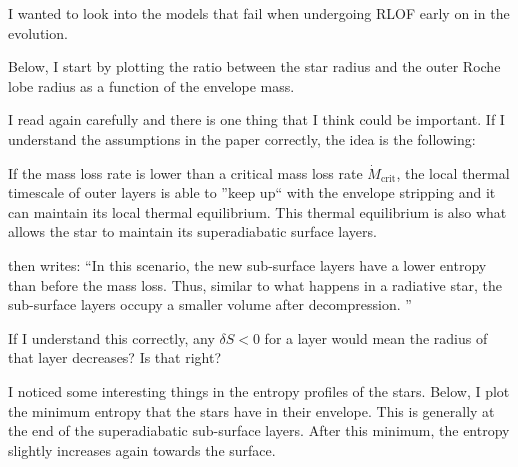 \documentclass[a4paper,10pt]{article}
\begin{document}
I wanted to look into the models that fail when undergoing RLOF early on in the evolution.

Below, I start by plotting the ratio between the star radius and the outer Roche lobe radius as
a function of the envelope mass.

\begin{figure}[ht]
	\centering
\end{figure}

I read \citet{temmink2022} again carefully and there is one thing that I think could be important.
If I understand the assumptions in the paper correctly, the idea is the following:

If the mass loss rate is lower than a critical mass loss rate \(\dot{M}_\text{crit}\), the local
thermal timescale of outer layers is able to ''keep up`` with the envelope stripping and it
can maintain its local thermal equilibrium.
This thermal equilibrium is also what allows the star
to maintain its superadiabatic surface layers.

\citet{temmink2022} then writes: ``In this scenario, the new sub-surface layers have a lower entropy than before the mass loss.
Thus, similar to what happens in a radiative star, the sub-surface layers occupy a smaller volume after decompression.
''

If I understand this correctly, any \(\delta S < 0\) for a layer would mean the radius of that layer decreases?
Is that right?

I noticed some interesting things in the entropy profiles of the stars.
Below, I plot the minimum entropy that the stars have in their envelope.
This is generally
at the end of the superadiabatic sub-surface layers.
After this minimum, the entropy slightly
increases again towards the surface.

\begin{figure}[ht]
	\centering
\end{figure}
\end{document}
